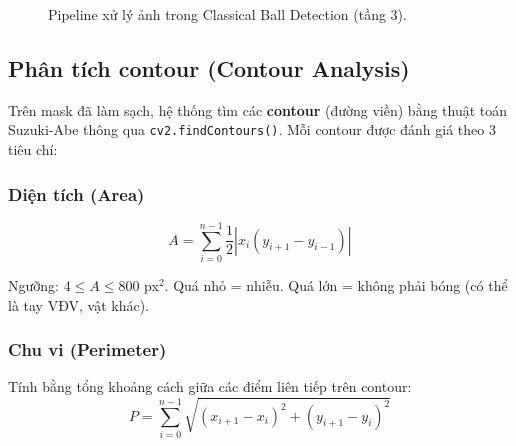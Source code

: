 \documentclass[12pt,a4paper]{article}
\begin{document}
\begin{figure}[H]
\centering
{}
\caption{Pipeline xử lý ảnh trong Classical Ball Detection (tầng 3).}
\label{fig:cv_pipeline}
\end{figure}

\subsection{Phân tích contour (Contour Analysis)}
\label{sec:contour}

Trên mask đã làm sạch, hệ thống tìm các \textbf{contour} (đường viền) bằng thuật toán Suzuki-Abe \cite{suzuki1985} thông qua \texttt{cv2.findContours()}. Mỗi contour được đánh giá theo 3 tiêu chí:

\subsubsection{Diện tích (Area)}
\begin{equation}
A = \sum_{i=0}^{n-1} \frac{1}{2} |x_i(y_{i+1} - y_{i-1})|
\label{eq:area}
\end{equation}

Ngưỡng: $4 \leq A \leq 800$ px$^2$. Quá nhỏ = nhiễu. Quá lớn = không phải bóng (có thể là tay VĐV, vật khác).

\subsubsection{Chu vi (Perimeter)}
Tính bằng tổng khoảng cách giữa các điểm liên tiếp trên contour:
\begin{equation}
P = \sum_{i=0}^{n-1} \sqrt{(x_{i+1} - x_i)^2 + (y_{i+1} - y_i)^2}
\end{equation}
\end{document}
